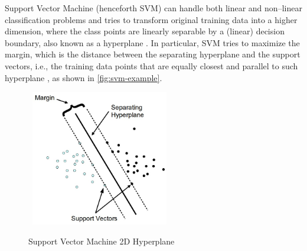Support Vector Machine (henceforth SVM) can handle both linear and non--linear classification problems and tries to transform original training data into a higher dimension, where the class points are linearly separable by a (linear) decision boundary, also known as a hyperplane \citep{han2011data}.
In particular, SVM tries to maximize the margin, which is the distance between the separating hyperplane and the support vectors, i.e., the training data points that are equally closest and parallel to such hyperplane \citep{tatsat2020machine}, as shown in \autoref{fig:svm-example}.

\begin{figure}[H]
    \centering
    \caption{Support Vector Machine 2D Hyperplane}\vspace{0.5em}
    \label{fig:svm-example}\
    \includegraphics[width=60mm]{Figures/svmhyperplane.jpg}

    \vspace{-1em}
\end{figure}

